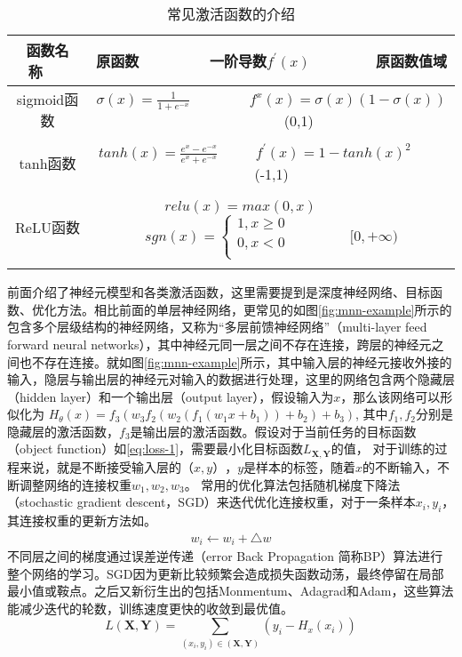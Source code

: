 \begin{table}[htpb]
  \centering
  \caption{常见激活函数的介绍}
  \label{tab:activate-func}
  \begin{tabular}{c|c}
    \toprule
    函数名称~~~ & 原函数 ~~~~~~~~一阶导数$f^{'}(x)$~~~~~~~~原函数值域 \\
    \midrule
    sigmoid函数 & $\sigma(x) = \frac{1}{1+e^{-x}}$ ~~~~~~~ $f^{x}(x)=\sigma(x)(1-\sigma(x))$ ~~~~~~~ (0,1) \\ \\
    tanh函数 & $tanh(x) = \frac{e^x-e^{-x}}{e^x+e^{-x}}$ ~~~~ $f^{'}(x)=1-tanh(x)^{2}$ ~~~~ (-1,1) \\ \\
    ReLU函数 & $relu(x) = max(0,x)$ ~~~~~~~~  $sgn(x)=\left\{ \begin{aligned} 1, x\geq 0 \\ 0, x<0 \\ \end{aligned} \right.$ ~~~~~~~ $ [0,+\infty)$ \\ \\
    \bottomrule
  \end{tabular}
\end{table}

前面介绍了神经元模型和各类激活函数，这里需要提到是深度神经网络、目标函数、优化方法。相比前面的单层神经网络，更常见的如图\ref{fig:mnn-example}所示的包含多个层级结构的神经网络，又称为``多层前馈神经网络''（multi-layer feed forward neural networks），其中神经元同一层之间不存在连接，跨层的神经元之间也不存在连接。就如图\ref{fig:mnn-example}所示，其中输入层的神经元接收外接的输入，隐层与输出层的神经元对输入的数据进行处理，这里的网络包含两个隐藏层（hidden layer）和一个输出层（output layer），假设输入为$x$，那么该网络可以形似化为
$H_{\theta}(x) = f_3(w_{3}f_2(w_{2}(f_{1}(w_{1}x+b_1))+b_2)+b_3)$, 其中$f_{1},f_{2}$分别是隐藏层的激活函数，$f_{3}$是输出层的激活函数。假设对于当前任务的目标函数（object function）如\ref{eq:loss-1}，需要最小化目标函数$L_{\mathbf{X},\mathbf{Y}}$的值， 对于训练的过程来说，就是不断接受输入层的$（x,y）$，$y$是样本的标签，随着$x$的不断输入，不断调整网络的连接权重$w_1,w_2,w_3$。 常用的优化算法包括随机梯度下降法（stochastic gradient descent，SGD）来迭代优化连接权重，对于一条样本$x_{i},y_{i}$，其连接权重的更新方法如。
\begin{equation}
    \begin{split}
        w_i  \leftarrow w_i +\bigtriangleup w
    \end{split}
\end{equation}
不同层之间的梯度通过误差逆传递（error Back Propagation 简称BP）\cite{rumelhart1988learning}算法进行整个网络的学习。SGD因为更新比较频繁会造成损失函数动荡，最终停留在局部最小值或鞍点。之后又新衍生出的包括Monmentum、Adagrad\cite{duchi2011adaptive}和Adam\cite{kingma2014adam}，这些算法能减少迭代的轮数，训练速度更快的收敛到最优值。
\begin{equation}\label{eq:loss-1}
    L(\mathbf{X},\mathbf{Y}) = \sum_{(x_i,y_i) \in (\mathbf{X},\mathbf{Y})}(y_{i} - H_{x}(x_{i}))
\end{equation}

